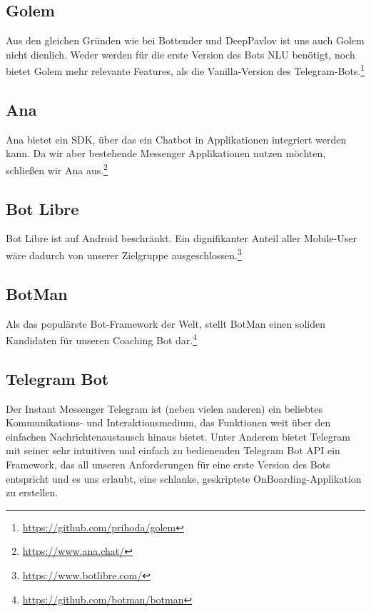         \subsection{Golem} 
            Aus den gleichen Gründen wie bei Bottender und DeepPavlov ist uns auch Golem nicht dienlich. Weder werden für die erste Version des Bots NLU benötigt, noch bietet Golem mehr relevante Features, als die Vanilla-Version des Telegram-Bots.\footnote{\url{https://github.com/prihoda/golem}}
        
        \subsection{Ana} 
            Ana bietet ein SDK, über das ein Chatbot in Applikationen integriert werden kann. Da wir aber bestehende Messenger Applikationen nutzen möchten, schließen wir Ana aus.\footnote{\url{https://www.ana.chat/}}
        
        \subsection{Bot Libre} 
            Bot Libre ist auf Android beschränkt. Ein dignifikanter Anteil aller Mobile-User wäre dadurch von unserer Zielgruppe ausgeschlossen.\footnote{\url{https://www.botlibre.com/}} 
            
        \subsection{BotMan} \label{BotMan}
            Als das populärste Bot-Framework der Welt, stellt BotMan einen soliden Kandidaten für unseren Coaching Bot dar.\footnote{\url{https://github.com/botman/botman}}
        
        \subsection{Telegram Bot}
            Der Instant Messenger Telegram ist (neben vielen anderen) ein beliebtes Kommunikations- und Interaktionsmedium, das Funktionen weit über den einfachen Nachrichtenaustausch hinaus bietet. Unter Anderem bietet Telegram mit seiner sehr intuitiven und einfach zu bedienenden Telegram Bot API ein Framework, das all unseren Anforderungen für eine erste Version des Bots entspricht und es uns erlaubt, eine schlanke, geskriptete OnBoarding-Applikation zu erstellen.


